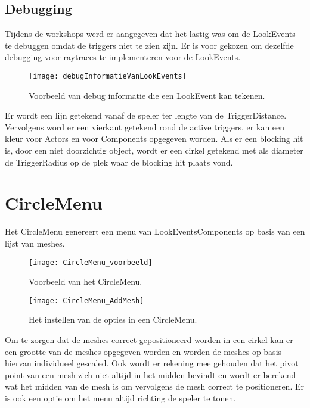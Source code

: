 \subsection{Debugging}
Tijdens de workshops werd er aangegeven dat het lastig was om de LookEvents te debuggen omdat de triggers niet te zien zijn. Er is voor gekozen om dezelfde debugging voor raytraces te implementeren voor de LookEvents.

\begin{figure}[!ht]
  \centering
    \texttt{[image: debugInformatieVanLookEvents]}
    \caption{Voorbeeld van debug informatie die een LookEvent kan tekenen.}
\end{figure}

Er wordt een lijn getekend vanaf de speler ter lengte van de TriggerDistance. Vervolgens word er een vierkant getekend rond de active triggers, er kan een kleur voor Actors en voor Components opgegeven worden. Als er een blocking hit is, door een niet doorzichtig object, wordt er een cirkel getekend met als diameter de TriggerRadius op de plek waar de blocking hit plaats vond.

\section{CircleMenu}
Het CircleMenu genereert een menu van LookEventsComponents op basis van een lijst van meshes.

\begin{figure}[!ht]
  \centering
    \texttt{[image: CircleMenu\_voorbeeld]}
    \caption{Voorbeeld van het CircleMenu.}
\end{figure}

\begin{figure}[!ht]
  \centering
    \texttt{[image: CircleMenu\_AddMesh]}
    \caption{Het instellen van de opties in een CircleMenu.}
\end{figure}

Om te zorgen dat de meshes correct gepositioneerd worden in een cirkel kan er een grootte van de meshes opgegeven worden en worden de meshes op basis hiervan individueel gescaled. Ook wordt er rekening mee gehouden dat het pivot point van een mesh zich niet altijd in het midden bevindt en wordt er berekend wat het midden van de mesh is om vervolgens de mesh correct te positioneren. Er is ook een optie om het menu altijd richting de speler te tonen. 

